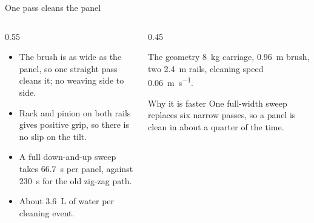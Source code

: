 \documentclass[aspectratio=169,10pt]{beamer}
\begin{document}
\begin{frame}{One pass cleans the panel}
  \begin{columns}[T]
    \begin{column}{0.55\textwidth}
      \begin{itemize}\setlength\itemsep{0.4em}
        \item The brush is as wide as the panel, so one straight pass cleans it; no weaving side to side.
        \item Rack and pinion on both rails gives positive grip, so there is no slip on the tilt.
        \item A full down-and-up sweep takes \SI{66.7}{s} per panel, against \SI{230}{s} for the old zig-zag path.
        \item About \SI{3.6}{\liter} of water per cleaning event.
      \end{itemize}
    \end{column}
    \begin{column}{0.45\textwidth}
      \begin{block}{The geometry}
        \SI{8}{kg} carriage, \SI{0.96}{m} brush, two \SI{2.4}{m} rails, cleaning speed \SI{0.06}{\meter\per\second}.
      \end{block}
      \begin{block}{Why it is faster}
        One full-width sweep replaces six narrow passes, so a panel is clean in about a quarter of the time.
      \end{block}
    \end{column}
  \end{columns}
\end{frame}
\end{document}
